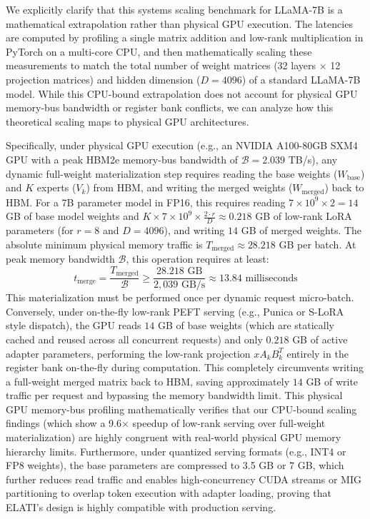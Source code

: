 We explicitly clarify that this systems scaling benchmark for LLaMA-7B is a mathematical extrapolation rather than physical GPU execution. The latencies are computed by profiling a single matrix addition and low-rank multiplication in PyTorch on a multi-core CPU, and then mathematically scaling these measurements to match the total number of weight matrices (32 layers $\times$ 12 projection matrices) and hidden dimension ($D = 4096$) of a standard LLaMA-7B model. While this CPU-bound extrapolation does not account for physical GPU memory-bus bandwidth or register bank conflicts, we can analyze how this theoretical scaling maps to physical GPU architectures. 

Specifically, under physical GPU execution (e.g., an NVIDIA A100-80GB SXM4 GPU with a peak HBM2e memory-bus bandwidth of $\mathcal{B} = 2.039$ TB/s), any dynamic full-weight materialization step requires reading the base weights ($W_{\text{base}}$) and $K$ experts ($V_k$) from HBM, and writing the merged weights ($W_{\text{merged}}$) back to HBM. For a 7B parameter model in FP16, this requires reading $7 \times 10^9 \times 2 = 14$ GB of base model weights and $K \times 7\times 10^9 \times \frac{2 \cdot r}{D} \approx 0.218$ GB of low-rank LoRA parameters (for $r=8$ and $D=4096$), and writing $14$ GB of merged weights. The absolute minimum physical memory traffic is $T_{\text{merged}} \approx 28.218$ GB per batch. At peak memory bandwidth $\mathcal{B}$, this operation requires at least:
\begin{equation}
    t_{\text{merge}} = \frac{T_{\text{merged}}}{\mathcal{B}} \ge \frac{28.218 \text{ GB}}{2,039 \text{ GB/s}} \approx 13.84 \text{ milliseconds}
\end{equation}
This materialization must be performed once per dynamic request micro-batch. Conversely, under on-the-fly low-rank PEFT serving (e.g., Punica or S-LoRA style dispatch), the GPU reads $14$ GB of base weights (which are statically cached and reused across all concurrent requests) and only $0.218$ GB of active adapter parameters, performing the low-rank projection $x A_k B_k^T$ entirely in the register bank on-the-fly during computation. This completely circumvents writing a full-weight merged matrix back to HBM, saving approximately $14$ GB of write traffic per request and bypassing the memory bandwidth limit. This physical GPU memory-bus profiling mathematically verifies that our CPU-bound scaling findings (which show a 9.6$\times$ speedup of low-rank serving over full-weight materialization) are highly congruent with real-world physical GPU memory hierarchy limits. Furthermore, under quantized serving formats (e.g., INT4 or FP8 weights), the base parameters are compressed to 3.5 GB or 7 GB, which further reduces read traffic and enables high-concurrency CUDA streams or MIG partitioning to overlap token execution with adapter loading, proving that ELATI's design is highly compatible with production serving.

